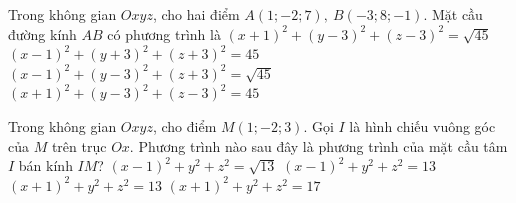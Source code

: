 \begin{ex}%
	Trong không gian $Oxyz$, cho hai điểm $A(1;-2;7),\ B(-3;8;-1)$. Mặt cầu đường kính $AB$ có phương trình là
	\choice
	{$(x+1)^2+(y-3)^2+(z-3)^2=\sqrt{45}$}
	{$(x-1)^2+(y+3)^2+(z+3)^2=45$}
	{$(x-1)^2+(y-3)^2+(z+3)^2=\sqrt{45}$}
	{\True $(x+1)^2+(y-3)^2+(z-3)^2=45$}
\end{ex}
\begin{ex}%
	Trong không gian $Oxyz$, cho điểm $M(1;-2;3)$. Gọi $I$ là hình chiếu vuông góc của $M$ trên trục $Ox$. Phương trình nào sau đây là phương trình của mặt cầu tâm $I$ bán kính $IM$?
	\choice
	{$(x-1)^2+y^2+z^2=\sqrt{13}$}
	{\True $(x-1)^2+y^2+z^2=13$}
	{$(x+1)^2+y^2+z^2=13$}
	{$(x+1)^2+y^2+z^2=17$}
\end{ex}


